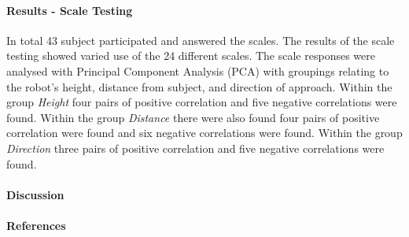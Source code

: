 \documentclass[a4paper]{article}
\begin{document}
\paragraph{Results - Scale Testing}
In total 43 subject participated and answered the scales. The results of the scale testing showed varied use of the 24 different scales. The scale responses were analysed with Principal Component Analysis (PCA) with groupings relating to the robot’s height, distance from subject, and direction of approach. Within the group \textit{Height} four pairs of positive correlation and five negative correlations were found.  Within the group \textit{Distance} there were also found four pairs of positive correlation were found and six negative correlations were found. Within the group \textit{Direction} three pairs of positive correlation and five negative correlations were found. 

\paragraph{Discussion}


\paragraph{References}
\end{document}
